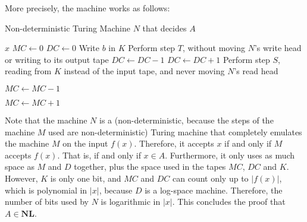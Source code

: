 \documentclass{amsart}
\theoremstyle{plain}
\theoremstyle{definition}
\newcommand{\nl}{\textbf{NL}}
\begin{document}
\begin{enumerate}[label=\textbf{Exercise \arabic*:}, leftmargin=0cm, labelwidth=-0.2cm, align=left]
            More precisely, the machine works as follows:

            \begin{algorithm}[H]
            \caption{Non-deterministic Turing Machine $N$ that decides $A$}
            \label{alg:kpartite}
            \begin{algorithmic}[1]
                \Require $x$
                \State $MC \gets 0$
                 \label{line:S}
                        \State $DC \gets 0$
                                \State Write $b$ in $K$
                            \EndIf
                            \State Perform step $T$, without moving $N$'s write head or writing to its output tape
                                \State $DC \gets DC - 1$
                                \State $DC \gets DC + 1$
                            \EndIf
                        \EndFor
                    \EndIf
                    \State Perform step $S$, reading from $K$ instead of the input tape, and never moving $N$'s read head

                        \State $MC \gets MC - 1$

                        \State $MC \gets MC + 1$

                    \EndIf
                \EndFor
                
                    \end{algorithmic}
        \end{algorithm}

        Note that the machine $N$ is a (non-deterministic, because the steps of the machine
        $M$ used are non-deterministic) Turing machine that completely emulates the machine $M$
        on the input $f(x)$.
        Therefore, it accepts $x$ if and only if $M$ accepts $f(x)$.
        That is, if and only if $x \in A$.
        Furthermore, it only uses as much space as $M$ and $D$ together, plus
        the space used in the tapes $MC$, $DC$ and $K$.
        However, $K$ is only one bit, and $MC$ and $DC$ can count only up to $|f(x)|$, which is polynomial in $|x|$,
        because $D$ is a log-space machine.
        Therefore, the number of bits used by $N$ is logarithmic in $|x|$.
        This concludes the proof that $A \in \nl$.


\end{enumerate}
\end{document}
